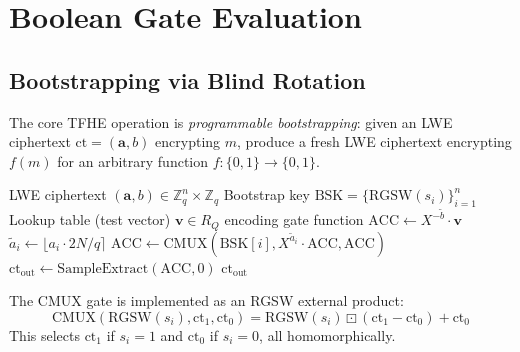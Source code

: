 \section{Boolean Gate Evaluation}

\label{sec:tfhe}

\subsection{Bootstrapping via Blind Rotation}

The core TFHE operation is \emph{programmable bootstrapping}: given an LWE ciphertext
$\text{ct} = (\mathbf{a}, b)$ encrypting $m$, produce a fresh LWE ciphertext encrypting
$f(m)$ for an arbitrary function $f: \{0,1\} \to \{0,1\}$.

\begin{algorithm}[H]
\caption{TFHE Blind Rotation (Bootstrapping)}
\label{alg:bootstrap}
\begin{algorithmic}[1]
\Require LWE ciphertext $(\mathbf{a}, b) \in \mathbb{Z}_q^n \times \mathbb{Z}_q$
\Require Bootstrap key $\text{BSK} = \{\text{RGSW}(s_i)\}_{i=1}^n$
\Require Lookup table (test vector) $\mathbf{v} \in R_Q$ encoding gate function
\State {}
\State $\text{ACC} \gets X^{-\tilde{b}} \cdot \mathbf{v}$ 
\State {}
\State {}
    \State $\tilde{a}_i \gets \lfloor a_i \cdot 2N/q \rceil$ 
    \State $\text{ACC} \gets \text{CMUX}(\text{BSK}[i], X^{\tilde{a}_i} \cdot \text{ACC}, \text{ACC})$
    \State {}
\EndFor
\State {}
\State $\text{ct}_{\text{out}} \gets \text{SampleExtract}(\text{ACC}, 0)$
\State \Return $\text{ct}_{\text{out}}$ 
\end{algorithmic}
\end{algorithm}

The CMUX gate is implemented as an RGSW external product:
\[
\text{CMUX}(\text{RGSW}(s_i), \text{ct}_1, \text{ct}_0) = \text{RGSW}(s_i) \boxdot (\text{ct}_1 - \text{ct}_0) + \text{ct}_0
\]
This selects $\text{ct}_1$ if $s_i = 1$ and $\text{ct}_0$ if $s_i = 0$, all homomorphically.

